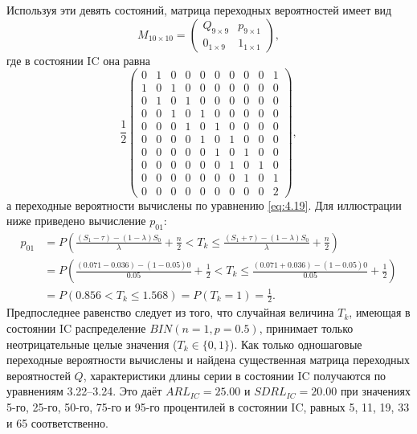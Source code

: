 Используя эти девять состояний, матрица переходных вероятностей имеет вид
\[
	M_{10\times10} = \left(\begin{array}{c|c} Q_{9\times9} & p_{9\times1} \\ \hline 0_{1\times9} & 1_{1\times1} \end{array}\right),
\]
где в состоянии IC она равна
\[
	\frac{1}{2}\left(\begin{array}{ccccccccc|c}
		0 & 1 & 0 & 0 & 0 & 0 & 0 & 0 & 0 & 1 \\
		1 & 0 & 1 & 0 & 0 & 0 & 0 & 0 & 0 & 0 \\
		0 & 1 & 0 & 1 & 0 & 0 & 0 & 0 & 0 & 0 \\
		0 & 0 & 1 & 0 & 1 & 0 & 0 & 0 & 0 & 0 \\
		0 & 0 & 0 & 1 & 0 & 1 & 0 & 0 & 0 & 0 \\
		0 & 0 & 0 & 0 & 1 & 0 & 1 & 0 & 0 & 0 \\
		0 & 0 & 0 & 0 & 0 & 1 & 0 & 1 & 0 & 0 \\
		0 & 0 & 0 & 0 & 0 & 0 & 1 & 0 & 1 & 0 \\
		0 & 0 & 0 & 0 & 0 & 0 & 0 & 1 & 0 & 1 \\
		\hline
		0 & 0 & 0 & 0 & 0 & 0 & 0 & 0 & 0 & 2
	\end{array}\right),
\]
а переходные вероятности вычислены по уравнению \eqref{eq:4.19}. Для иллюстрации ниже приведено вычисление \(p_{01}\):
\begin{align*}
	p_{01} &= P\left( \frac{(S_1 - \tau) - (1 - \lambda)S_0}{\lambda} + \frac{n}{2} < T_k \le \frac{(S_1 + \tau) - (1 - \lambda)S_0}{\lambda} + \frac{n}{2} \right) \\
	      &= P\left( \frac{(0.071 - 0.036) - (1 - 0.05)0}{0.05} + \frac{1}{2} < T_k \le \frac{(0.071 + 0.036) - (1 - 0.05)0}{0.05} + \frac{1}{2} \right) \\
	      &= P(0.856 < T_k \le 1.568) = P(T_k = 1) = \frac{1}{2}.
\end{align*}
Предпоследнее равенство следует из того, что случайная величина \(T_k\), имеющая в состоянии IC распределение \(BIN(n = 1, p = 0.5)\), принимает только неотрицательные целые значения (\(T_k \in \{0, 1\}\)). Как только одношаговые переходные вероятности вычислены и найдена существенная матрица переходных вероятностей \(Q\), характеристики длины серии в состоянии IC получаются по уравнениям 3.22--3.24. Это даёт \(ARL_{IC} = 25.00\) и \(SDRL_{IC} = 20.00\) при значениях 5-го, 25-го, 50-го, 75-го и 95-го процентилей в состоянии IC, равных 5, 11, 19, 33 и 65 соответственно.


